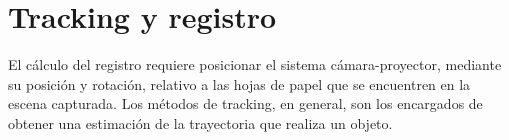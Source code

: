 




\section{Tracking y registro}
El cálculo del registro requiere posicionar el sistema cámara-proyector, mediante su posición y
rotación, relativo a las hojas de papel que se encuentren en la escena capturada. Los métodos de
tracking, en general, son los encargados de obtener una estimación de la trayectoria que realiza un
objeto.

